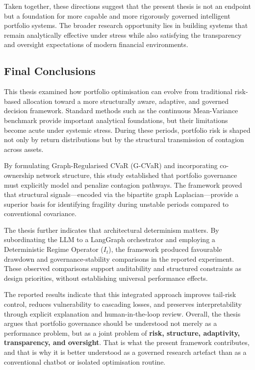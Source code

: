 \documentclass[11pt]{article}
\begin{document}
Taken together, these directions suggest that the present thesis is not an endpoint but a foundation for more capable and more rigorously governed intelligent portfolio systems. The broader research opportunity lies in building systems that remain analytically effective under stress while also satisfying the transparency and oversight expectations of modern financial environments.

\subsection{Final Conclusions}

This thesis examined how portfolio optimisation can evolve from traditional risk-based allocation toward a more structurally aware, adaptive, and governed decision framework. Standard methods such as the continuous Mean-Variance benchmark provide important analytical foundations, but their limitations become acute under systemic stress. During these periods, portfolio risk is shaped not only by return distributions but by the structural transmission of contagion across assets.

By formulating Graph-Regularised CVaR (G-CVaR) and incorporating co-ownership network structure, this study established that portfolio governance must explicitly model and penalize contagion pathways. The framework proved that structural signals---encoded via the bipartite graph Laplacian---provide a superior basis for identifying fragility during unstable periods compared to conventional covariance.

The thesis further indicates that architectural determinism matters. By subordinating the LLM to a LangGraph orchestrator and employing a Deterministic Regime Operator ($I_t$), the framework produced favourable drawdown and governance-stability comparisons in the reported experiment. These observed comparisons support auditability and structured constraints as design priorities, without establishing universal performance effects.

The reported results indicate that this integrated approach improves tail-risk control, reduces vulnerability to cascading losses, and preserves interpretability through explicit explanation and human-in-the-loop review. Overall, the thesis argues that portfolio governance should be understood not merely as a performance problem, but as a joint problem of \textbf{risk, structure, adaptivity, transparency, and oversight}. That is what the present framework contributes, and that is why it is better understood as a governed research artefact than as a conventional chatbot or isolated optimisation routine.
\end{document}
